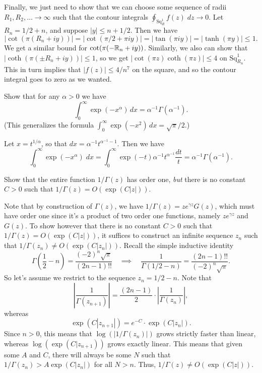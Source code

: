 \documentclass{pset}
\begin{document}
Finally, we just need to show that we can choose some sequence of radii $R_1, R_2, \ldots \to \infty$ such that the contour integrals $\oint_{\textrm{Sq}^1_R} f(z)\;dz \to 0$. Let $R_n = 1/2+n$, and suppose $|y|\leq n+1/2$. Then we have
\[
    |\cot(\pi(R_n+iy))| = |\cot(\pi/2 + \pi iy)| = |\tan(\pi i y)|=|\tanh(\pi y)|\leq 1.
\]
We get a similar bound for $\cot(\pi(-\mathbb{R}_n+iy))$. Similarly, we also can show that $|\coth(\pi(\pm R_n+iy))|\leq 1$, so we get $|\cot(\pi z)\coth(\pi z)|\leq 4$ on $\mathrm{Sq}^1_{R_n}$. This in turn implies that $|f(z)|\leq 4/n^7$ on the square, and so the contour integral goes to zero as we wanted.

\begin{problem}{3.20}
  Show that for any $\alpha > 0$ we have
  \[
    \int^\infty_0 \exp(-x^\alpha)\,dx = \alpha^{-1}\Gamma(\alpha^{-1}).
  \]
  (This generalizes the formula $\int^\infty_0 \exp(-x^2)\,dx = \sqrt{\pi}/2.$)
\end{problem}

\begin{solution}
  Let $x=t^{1/\alpha}$, so that $dx = \alpha^{-1} t^{\alpha^{-1} - 1}$. Then we have
  \[
    \int^\infty_0 \exp(-x^\alpha)\;dx = \int^\infty_0 \exp(-t) \alpha^{-1} t^{\alpha^{-1}} \frac{dt}{t} = \alpha^{-1}\Gamma(\alpha^{-1}).
  \]
\end{solution}

\begin{problem}{3.23}
  Show that the entire function $1/\Gamma(z)$ has order one, \emph{but} there is no constant $C > 0$ such that $1/\Gamma(z) = O(\exp(C|z|))$.
\end{problem}

\begin{solution}
  Note that by construction of $\Gamma(z)$, we have $1/\Gamma(z) = ze^{\gamma z}G(z)$, which must have order one since it's a product of two order one functions, namely $ze^{\gamma z}$ and $G(z)$. To show however that there is no constant $C>0$ such that $1/\Gamma(z)=O(\exp(C|z|))$, it suffices to construct an infinite sequence $z_n$ such that $1/\Gamma(z_n) \neq O(\exp(C|z_n|))$. Recall the simple inductive identity
  \[
    \Gamma\left(\frac{1}{2}-n\right) = \frac{(-2)^n\sqrt{\pi}}{(2n-1)!!} \quad\implies\quad \frac{1}{\Gamma(1/2-n)} = \frac{(2n-1)!!}{(-2)^n \sqrt{\pi}}.
  \]
  So let's assume we restrict to the sequence $z_n = 1/2-n$. Note that
  \[
    \left|\frac{1}{\Gamma(z_{n+1})}\right| = \frac{(2n-1)}{2}\cdot \left|\frac{1}{\Gamma(z_n)}\right|,
  \]
  whereas
  \[
    \exp(C|z_{n+1}|) = e^{-C} \cdot \exp(C|z_n|).
  \]
  Since $n>0$, this means that $\log(|1/\Gamma(z_n)|)$ grows strictly faster than linear, whereas $\log(\exp(C|z_{n+1}))$ grows exactly linear. This means that given some $A$ and $C$, there will always be some $N$ such that $1/\Gamma(z_n) > A\exp(C|z_n|)$ for all $N>n$. Thus, $1/\Gamma(z)\neq O(\exp(C|z|))$.
\end{solution}
\end{document}
